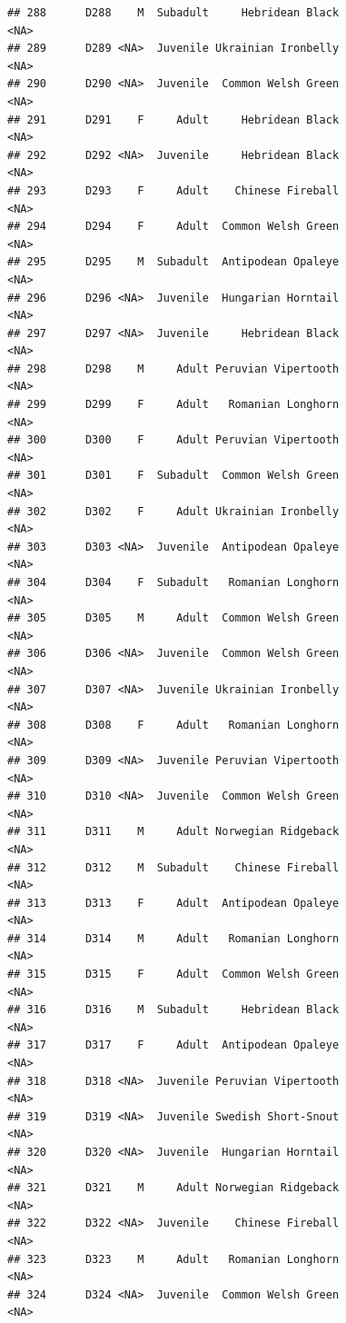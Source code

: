\documentclass[
]{book}
\begin{document}
\begin{verbatim}
## 288      D288    M  Subadult     Hebridean Black                <NA>
## 289      D289 <NA>  Juvenile Ukrainian Ironbelly                <NA>
## 290      D290 <NA>  Juvenile  Common Welsh Green                <NA>
## 291      D291    F     Adult     Hebridean Black                <NA>
## 292      D292 <NA>  Juvenile     Hebridean Black                <NA>
## 293      D293    F     Adult    Chinese Fireball                <NA>
## 294      D294    F     Adult  Common Welsh Green                <NA>
## 295      D295    M  Subadult  Antipodean Opaleye                <NA>
## 296      D296 <NA>  Juvenile  Hungarian Horntail                <NA>
## 297      D297 <NA>  Juvenile     Hebridean Black                <NA>
## 298      D298    M     Adult Peruvian Vipertooth                <NA>
## 299      D299    F     Adult   Romanian Longhorn                <NA>
## 300      D300    F     Adult Peruvian Vipertooth                <NA>
## 301      D301    F  Subadult  Common Welsh Green                <NA>
## 302      D302    F     Adult Ukrainian Ironbelly                <NA>
## 303      D303 <NA>  Juvenile  Antipodean Opaleye                <NA>
## 304      D304    F  Subadult   Romanian Longhorn                <NA>
## 305      D305    M     Adult  Common Welsh Green                <NA>
## 306      D306 <NA>  Juvenile  Common Welsh Green                <NA>
## 307      D307 <NA>  Juvenile Ukrainian Ironbelly                <NA>
## 308      D308    F     Adult   Romanian Longhorn                <NA>
## 309      D309 <NA>  Juvenile Peruvian Vipertooth                <NA>
## 310      D310 <NA>  Juvenile  Common Welsh Green                <NA>
## 311      D311    M     Adult Norwegian Ridgeback                <NA>
## 312      D312    M  Subadult    Chinese Fireball                <NA>
## 313      D313    F     Adult  Antipodean Opaleye                <NA>
## 314      D314    M     Adult   Romanian Longhorn                <NA>
## 315      D315    F     Adult  Common Welsh Green                <NA>
## 316      D316    M  Subadult     Hebridean Black                <NA>
## 317      D317    F     Adult  Antipodean Opaleye                <NA>
## 318      D318 <NA>  Juvenile Peruvian Vipertooth                <NA>
## 319      D319 <NA>  Juvenile Swedish Short-Snout                <NA>
## 320      D320 <NA>  Juvenile  Hungarian Horntail                <NA>
## 321      D321    M     Adult Norwegian Ridgeback                <NA>
## 322      D322 <NA>  Juvenile    Chinese Fireball                <NA>
## 323      D323    M     Adult   Romanian Longhorn                <NA>
## 324      D324 <NA>  Juvenile  Common Welsh Green                <NA>

\end{verbatim}
\end{document}

